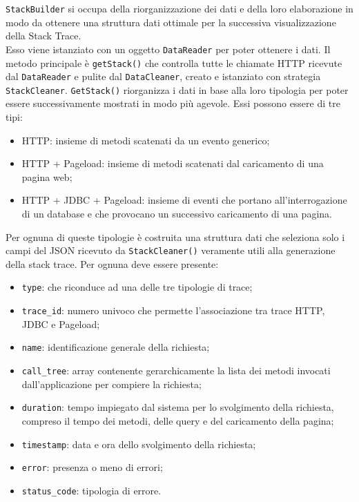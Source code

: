\texttt{StackBuilder} si occupa della riorganizzazione dei dati e della loro elaborazione in modo da ottenere una struttura dati ottimale per la successiva visualizzazione della Stack Trace.\\
Esso viene istanziato con un oggetto \texttt{DataReader} per poter ottenere i dati.
Il metodo principale è \texttt{getStack()} che controlla tutte le chiamate HTTP ricevute dal \texttt{DataReader} e pulite dal \texttt{DataCleaner}, creato e istanziato con strategia \texttt{StackCleaner}. \texttt{GetStack()} riorganizza i dati in base alla loro tipologia per poter essere successivamente mostrati in modo più agevole. Essi possono essere di tre tipi:
	\begin{itemize}
		\item HTTP: insieme di metodi scatenati da un evento generico;
		\item HTTP + Pageload: insieme di metodi scatenati dal caricamento di una pagina web;
		\item HTTP + JDBC + Pageload: insieme di eventi che portano all'interrogazione di un database e che provocano un successivo caricamento di una pagina.
	\end{itemize}
	Per ognuna di queste tipologie è costruita una struttura dati che seleziona solo i campi del JSON ricevuto da \texttt{StackCleaner()} veramente utili alla generazione della stack trace. Per ognuna deve essere presente:
	\begin{itemize}
		\item \texttt{type}: che riconduce ad una delle tre tipologie di trace;
		\item \texttt{trace\_id}: numero univoco che permette l'associazione tra trace HTTP, JDBC e Pageload;
		\item \texttt{name}: identificazione generale della richiesta;
		\item \texttt{call\_tree}: array contenente gerarchicamente la lista dei metodi invocati dall'applicazione per compiere la richiesta;
		\item \texttt{duration}: tempo impiegato dal sistema per lo svolgimento della richiesta, compreso il tempo dei metodi, delle query e del caricamento della pagina;
		\item \texttt{timestamp}: data e ora dello svolgimento della richiesta;
		\item \texttt{error}: presenza o meno di errori;
		\item \texttt{status\_code}: tipologia di errore.
	\end{itemize}
